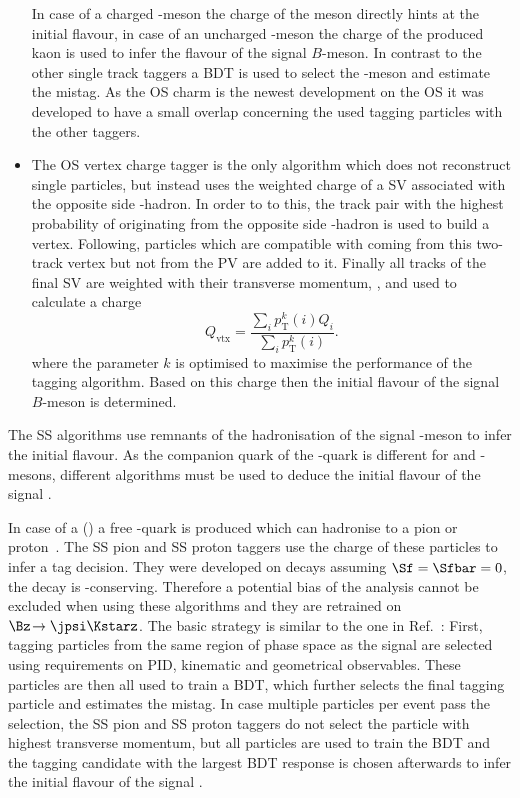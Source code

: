 \begin{itemize}
	In case of a charged \D-meson the charge of the meson directly hints at the initial flavour, in case of an uncharged \D-meson the charge of the produced kaon is used to infer the flavour of the signal $B$-meson.
	In contrast to the other single track taggers a \ac{BDT} is used to select the \D-meson and estimate the mistag.
	As the OS charm is the newest development on the OS it was developed to have a small overlap concerning the used tagging particles with the other taggers.
	\item The OS vertex charge tagger is the only algorithm which does not reconstruct single particles, but instead uses the weighted charge of a \ac{SV} associated with the opposite side \bquark-hadron.
	In order to to this, the track pair with the highest probability of originating from the opposite side \bquark-hadron is used to build a vertex.
	Following, particles which are compatible with coming from this two-track vertex but not from the \ac{PV} are added to it.
	Finally all tracks of the final \ac{SV} are weighted with their transverse momentum, \pt, and used to calculate a charge
	\begin{equation}
	Q_{\text{vtx}}=\frac{\sum_{i}p_{\mathrm T}^k(i)Q_i}{\sum_{i}p_{\mathrm T}^k(i)}.
	\end{equation}
	where the parameter $k$ is optimised to maximise the performance of the tagging algorithm.
	Based on this charge then the initial flavour of the signal $B$-meson is determined.
\end{itemize}

The SS algorithms use remnants of the hadronisation of the signal \B-meson to infer the initial flavour.
As the companion quark of the \bquark-quark is different for \Bz and \Bs-mesons, different algorithms must be used to deduce the initial flavour of the signal \B.

In case of a \Bz (\bquarkbar\dquark) a free \dquarkbar-quark is produced which can hadronise to a pion or proton~\cite{Aaij:2016rdg}.
The SS pion and SS proton taggers use the charge of these particles to infer a tag decision.
They were developed on \BdToDpi decays assuming $\Sf=\Sfbar=0$, \ie the decay \BdToDpi is \CP-conserving.
Therefore a potential bias of the analysis cannot be excluded when using these algorithms and they are retrained on $\Bz\!\to\jpsi\Kstarz$.
The basic strategy is similar to the one in Ref.~\cite{Aaij:2016rdg}:
First, tagging particles from the same region of phase space as the signal \B are selected using requirements on PID, kinematic and geometrical observables.
These particles are then all used to train a \ac{BDT}, which further selects the final tagging particle and estimates the mistag.
In case multiple particles per event pass the selection, the SS pion and SS proton taggers do not select the particle with highest transverse momentum, but all particles are used to train the \ac{BDT} and the tagging candidate with the largest \ac{BDT} response is chosen afterwards to infer the initial flavour of the signal \B.

